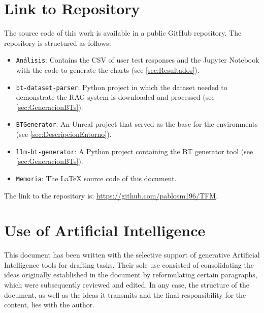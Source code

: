 \section{Link to Repository}
The source code of this work is available in a public GitHub repository.
The repository is structured as follows:

\begin{itemize}
	\item \texttt{Análisis}: Contains the CSV of user test responses and the Jupyter Notebook with the code to generate the charts (see \ref{sec:Resultados}).
	\item \texttt{bt-dataset-parser}: Python project in which the dataset needed to demonstrate the RAG system is downloaded and processed (see \ref{sec:GeneracionBTs}).
	\item \texttt{BTGenerator}: An Unreal project that served as the base for the environments (see \ref{sec:DescripcionEntorno}).
	\item \texttt{llm-bt-generator}: A Python project containing the BT generator tool (see \ref{sec:GeneracionBTs}).
	\item \texttt{Memoria}: The LaTeX source code of this document.
\end{itemize}

The link to the repository is: \url{https://github.com/pablosm196/TFM}.

\section{Use of Artificial Intelligence}
This document has been written with the selective support of generative Artificial Intelligence tools for drafting tasks.
Their sole use consisted of consolidating the ideas originally established in the document by reformulating certain paragraphs, which were subsequently reviewed and edited.
In any case, the structure of the document, as well as the ideas it transmits and the final responsibility for the content, lies with the author.